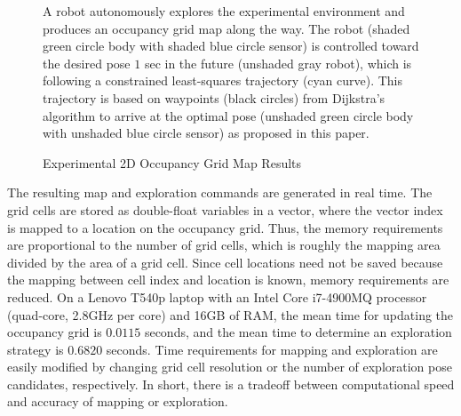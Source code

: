 \begin{figure}
{	}
\caption{Experimental 2D Occupancy Grid Map Results}
	\medskip
	\small
	A robot autonomously explores the experimental environment and produces an occupancy grid map along the way. The robot (shaded green circle body with shaded blue circle sensor) is controlled toward the desired pose $1$ sec in the future (unshaded gray robot), which is following a constrained least-squares trajectory (cyan curve). This trajectory is based on waypoints (black circles) from Dijkstra's algorithm to arrive at the optimal pose (unshaded green circle body with unshaded blue circle sensor) as proposed in this paper.
\label{fig:ExperimentOGM}
\end{figure}

The resulting map and exploration commands are generated in real time. The grid cells are stored as double-float variables in a vector, where the vector index is mapped to a location on the occupancy grid. Thus, the memory requirements are proportional to the number of grid cells, which is roughly the mapping area divided by the area of a grid cell. Since cell locations need not be saved because the mapping between cell index and location is known, memory requirements are reduced. On a Lenovo T540p laptop with an Intel Core i7-4900MQ processor (quad-core, 2.8GHz per core) and 16GB of RAM, the mean time for updating the occupancy grid is $0.0115$ seconds, and the mean time to determine an exploration strategy is $0.6820$ seconds. Time requirements for mapping and exploration are easily modified by changing grid cell resolution or the number of exploration pose candidates, respectively. In short, there is a tradeoff between computational speed and accuracy of mapping or exploration.

